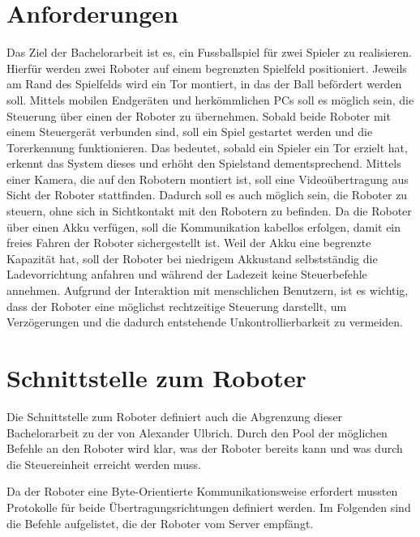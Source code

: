 \section{Anforderungen}
Das Ziel der Bachelorarbeit ist es, ein Fussballspiel für zwei Spieler zu realisieren. Hierfür werden zwei Roboter auf einem begrenzten Spielfeld positioniert. Jeweils am Rand des Spielfelds wird ein Tor montiert, in das der Ball befördert werden soll. Mittels mobilen Endgeräten und herkömmlichen PCs soll es möglich sein, die Steuerung über einen der Roboter zu übernehmen. Sobald beide Roboter mit einem Steuergerät verbunden sind, soll ein Spiel gestartet werden und die Torerkennung funktionieren. Das bedeutet, sobald ein Spieler ein Tor erzielt hat, erkennt das System dieses und erhöht den Spielstand dementsprechend. Mittels einer Kamera, die auf den Robotern montiert ist, soll eine Videoübertragung aus Sicht der Roboter stattfinden. Dadurch soll es auch möglich sein, die Roboter zu steuern, ohne sich in Sichtkontakt mit den Robotern zu befinden. Da die Roboter über einen Akku verfügen, soll die Kommunikation kabellos erfolgen, damit ein freies Fahren der Roboter sichergestellt ist. Weil der Akku eine begrenzte Kapazität hat, soll der Roboter bei niedrigem Akkustand selbstständig die Ladevorrichtung anfahren und während der Ladezeit keine Steuerbefehle annehmen. Aufgrund der Interaktion mit menschlichen Benutzern, ist es wichtig, dass der Roboter eine möglichst rechtzeitige Steuerung darstellt, um Verzögerungen und die dadurch entstehende Unkontrollierbarkeit zu vermeiden.

\section{Schnittstelle zum Roboter}
\label{sec:schnittstelle}
Die Schnittstelle zum Roboter definiert auch die Abgrenzung dieser Bachelorarbeit zu der von Alexander Ulbrich. Durch den Pool der möglichen Befehle an den Roboter wird klar, was der Roboter bereits kann und was durch die Steuereinheit erreicht werden muss. 

Da der Roboter eine Byte-Orientierte Kommunikationsweise erfordert mussten Protokolle für beide Übertragungsrichtungen definiert werden.
Im Folgenden sind die Befehle aufgelistet, die der Roboter vom Server empfängt. \\

